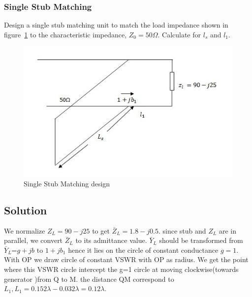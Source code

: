 \begin{exmp}
\subsubsection*{Single Stub Matching}
Design a single stub matching unit to match the load impedance shown in figure~\ref{fig:figw} to the characteristic impedance, $Z_0 = 50\varOmega$. Calculate for $l_s$ and $l_1$.
\begin{figure}[h]
\centering
\includegraphics[width=1\linewidth]{./graphics/figw}
\caption{Single Stub Matching design}
\label{fig:figw}
\end{figure}

\subsection*{Solution}
We normalize $Z_L=90-j25$ to get 
$\bar{Z}_L=1.8-j0.5$. since stub and $Z_L$ are in parallel,
we convert $\bar{Z}_L$ to its admittance value. $\bar{Y}_{L}$
should be transformed from 
$\bar{Y}_{L}$=$g+jb$ to $1+jb_1$ hence it lies on the circle of constant conductance $g=1$. With OP we draw circle of constant VSWR with OP as radius. We get the point where this VSWR circle intercept the g=1 circle at moving clockwise(towards generator )from Q to M. the distance QM correspond to $L_1, L_1=0.152\lambda-0.032\lambda=0.12\lambda$.


\end{exmp}
